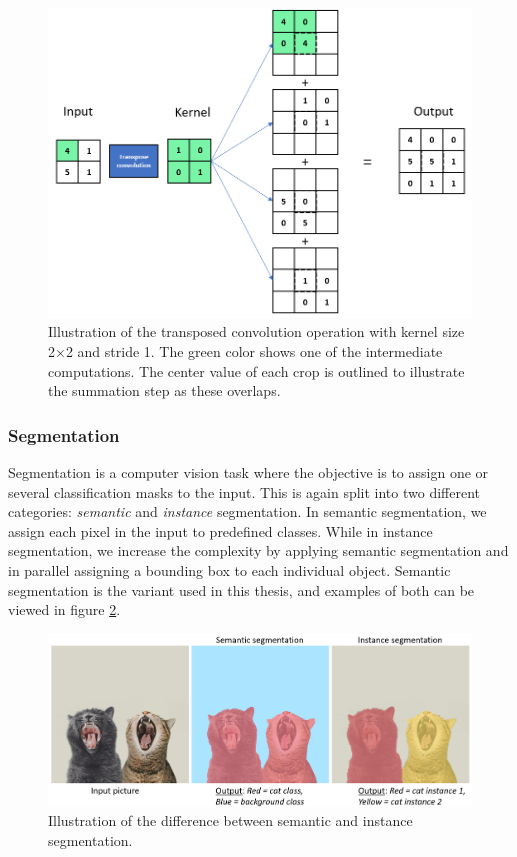     \begin{figure}[H]
        \centering
        \includegraphics[scale=0.5]{figures/transpose_convolution.png}
        \caption[Transposed convolution]{Illustration of the transposed convolution operation with kernel size 2×2 and stride 1. The green color shows one of the intermediate computations. The center value of each crop is outlined to illustrate the summation step as these overlaps.}
      	\medskip 
        \label{transposed_conv_fig}
    \end{figure}
    
\subsubsection{Segmentation}
    Segmentation is a computer vision task where the objective is to assign one or several classification masks to the input\cite{He_2017_ICCV_segmentation}. This is again split into two different categories: \textit{semantic} and \textit{instance} segmentation. In semantic segmentation, we assign each pixel in the input to predefined classes. While in instance segmentation, we increase the complexity by applying semantic segmentation and in parallel assigning a bounding box to each individual object. Semantic segmentation is the variant used in this thesis, and examples of both can be viewed in figure \ref{segmentation_fig}.
    
    \begin{figure}[H]
        \centering
        \includegraphics[scale=0.4]{figures/segmentation.png}
        \caption[Difference between semantic and instance segmentation]{Illustration of the difference between semantic and instance segmentation.}
      	\medskip 
        \label{segmentation_fig}
    \end{figure}

    


        

    
    